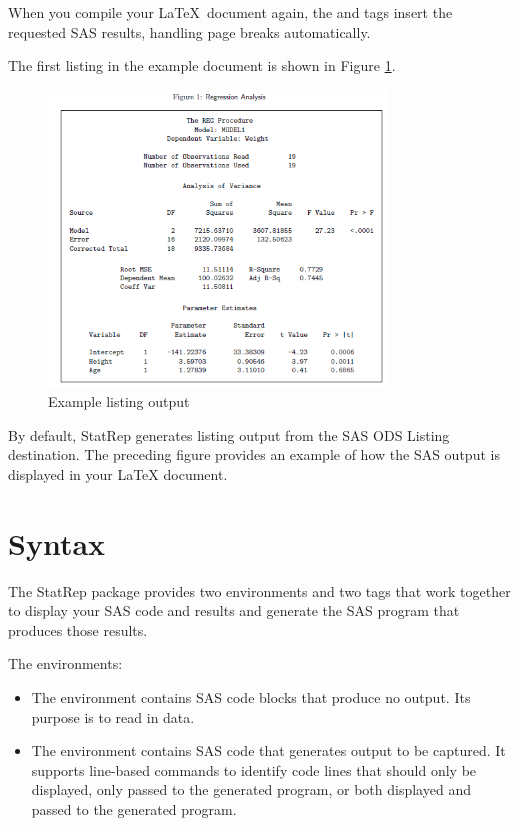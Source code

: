 \documentclass[article,oneside]{memoir}
\newcommand*{\StatRep}{\textsf{StatRep}\xspace}
\begin{document}
  When you compile your \LaTeX\ document again, the  and  tags
  insert the requested SAS results, handling page breaks automatically.

  The first listing in the example document is shown in Figure \ref{exfig}.

\begin{figure}[H]
\caption{Example listing output}\label{exfig}
\begin{snugshade}
\centering
\includegraphics[width=0.8\textwidth]{images/example_output}
\end{snugshade}
\end{figure}


By default, \StatRep generates listing output from the
SAS ODS Listing destination. The preceding figure provides an example
of how the SAS output is displayed in your LaTeX document.

\chapter{Syntax}

     The \StatRep package provides two environments and two tags that work
     together to display your SAS code and results and generate the SAS program
     that produces those results.

     The environments:
     \begin{itemize}
     \item The  environment contains SAS code blocks that produce no output.
     Its purpose is to read in data.
     \item The  environment contains SAS code that generates output to be
     captured. It supports line-based commands to identify
     code lines that should only be displayed, only passed to the generated program,
     or both displayed and passed to the generated program.
     \end{itemize}
\end{document}
